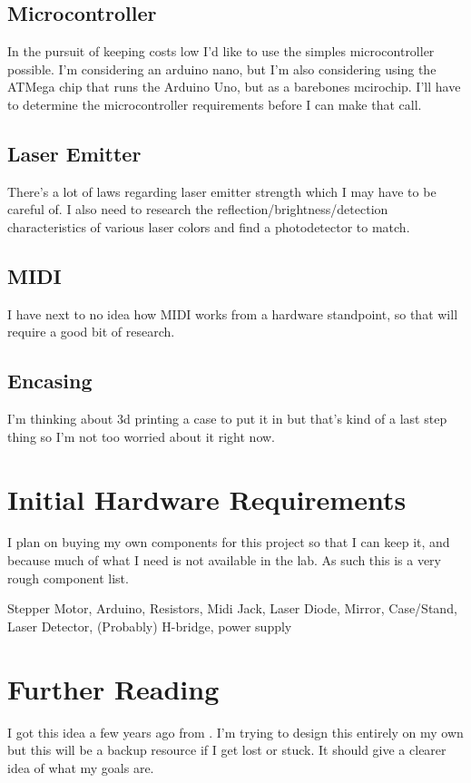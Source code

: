\documentclass[prb,preprint]{revtex4-1}
\begin{document}
\subsection{Microcontroller}
In the pursuit of keeping costs low I'd like to use the simples microcontroller possible. I'm considering an arduino nano, but I'm also considering using the ATMega chip that runs the Arduino Uno, but as a barebones mcirochip. I'll have to determine the microcontroller requirements before I can make that call.

\subsection{Laser Emitter}
There's a lot of laws regarding laser emitter strength which I may have to be careful of. I also need to research the reflection/brightness/detection characteristics of various laser colors and find a photodetector to match.

\subsection{MIDI}
I have next to no idea how MIDI works from a hardware standpoint, so that will require a good bit of research.

\subsection{Encasing}
I'm thinking about 3d printing a case to put it in but that's kind of a last step thing so I'm not too worried about it right now.

\section{Initial Hardware Requirements}
I plan on buying my own components for this project so that I can keep it, and because much of what I need is not available in the lab. As such this is a very rough component list.

\vspace{10mm}

Stepper Motor, Arduino, Resistors, Midi Jack, Laser Diode, Mirror, Case/Stand, Laser Detector, (Probably) H-bridge, power supply


\section{Further Reading}
I got this idea a few years ago from \url{}. I'm trying to design this entirely on my own but this will be a backup resource if I get lost or stuck. It should give a clearer idea of what my goals are.
\end{document}
